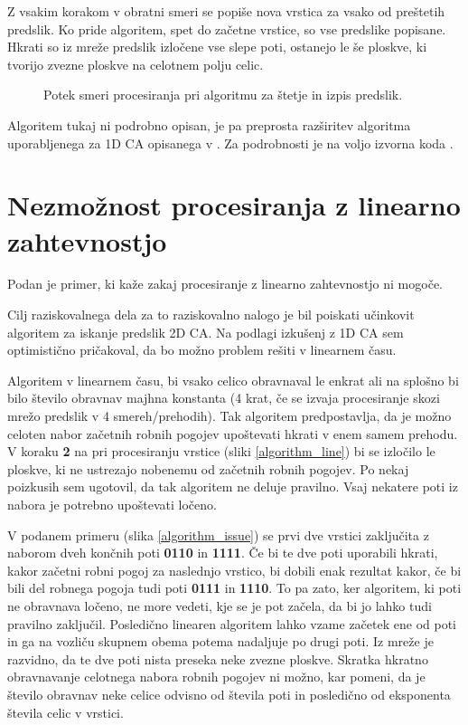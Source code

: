 \documentclass[12pt,a4paper,openany,twoside]{book}
\begin{document}
Z vsakim korakom v obratni smeri se popiše nova vrstica za vsako od preštetih predslik.
Ko pride algoritem, spet do začetne vrstice, so vse predslike popisane.
Hkrati so iz mreže predslik izločene vse slepe poti, ostanejo le še ploskve,
ki tvorijo zvezne ploskve na celotnem polju celic.

\begin{figure}[htb]
\centerline{}
\caption[Algoritem za izpis predslik.]{Potek smeri procesiranja pri algoritmu za štetje in izpis predslik.}
\label{algorithm_list}
\end{figure}

Algoritem tukaj ni podrobno opisan, je pa preprosta razširitev algoritma uporabljenega
za 1D CA opisanega v \cite{JerasDobnikar2007}. Za podrobnosti je na voljo izvorna koda \cite{Jeras2016-algirithm}.

\section{Nezmožnost procesiranja z linearno zahtevnostjo}

Podan je primer, ki kaže zakaj procesiranje z linearno zahtevnostjo ni mogoče.

Cilj raziskovalnega dela za to raziskovalno nalogo je bil poiskati
učinkovit algoritem za iskanje predslik 2D CA. Na podlagi izkušenj z 1D CA
sem optimistično pričakoval, da bo možno problem rešiti v linearnem času.

Algoritem v linearnem času, bi vsako celico obravnaval le enkrat
ali na splošno bi bilo število obravnav majhna konstanta (4 krat,
če se izvaja procesiranje skozi mrežo predslik v 4 smereh/prehodih).
Tak algoritem predpostavlja, da je možno celoten nabor začetnih
robnih pogojev upoštevati hkrati v enem samem prehodu.
V koraku \textbf{2} na pri procesiranju vrstice (sliki \ref{algorithm_line})
bi se izločilo le ploskve, ki ne ustrezajo nobenemu od začetnih robnih pogojev.
Po nekaj poizkusih sem ugotovil, da tak algoritem ne deluje pravilno.
Vsaj nekatere poti iz nabora je potrebno upoštevati ločeno.

V podanem primeru (slika \ref{algorithm_issue}) se prvi dve vrstici zaključita z
naborom dveh končnih poti \textbf{0110} in \textbf{1111}. Če bi te dve poti
uporabili hkrati, kakor začetni robni pogoj za naslednjo vrstico, bi dobili
enak rezultat kakor, če bi bili del robnega pogoja tudi poti \textbf{0111} in \textbf{1110}.
To pa zato, ker algoritem, ki poti ne obravnava ločeno, ne more vedeti,
kje se je pot začela, da bi jo lahko tudi pravilno zaključil.
Posledično linearen algoritem lahko vzame začetek ene od poti in ga
na vozliču skupnem obema potema nadaljuje po drugi poti.
Iz mreže je razvidno, da te dve poti nista preseka neke zvezne ploskve.
Skratka hkratno obravnavanje celotnega nabora robnih pogojev ni možno,
kar pomeni, da je število obravnav neke celice odvisno od števila poti
in posledično od eksponenta števila celic v vrstici.
\end{document}
